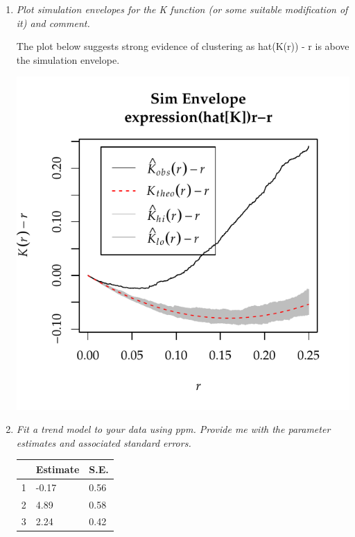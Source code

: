 \documentclass{article}\usepackage[]{graphicx}\usepackage[]{color}
\makeatletter
\def\maxwidth{ %
  \ifdim\Gin@nat@width>\linewidth
    \linewidth
  \else
    \Gin@nat@width
  \fi
}
\newenvironment{knitrout}{}{} %
\makeatother
\begin{document}
\begin{enumerate}
\begin{enumerate}
\begin{knitrout}
{}



\end{knitrout}


\newpage

\item %
{\it Plot simulation envelopes for the K function (or some suitable modification of it) and comment.}

The plot below suggests strong evidence of clustering as hat(K(r)) - r is above the simulation envelope.

\begin{knitrout}\footnotesize
{}\color{fgcolor}

{\centering \includegraphics[width=\maxwidth]{figure/prob2b-1} 

}



\end{knitrout}

\item %
{\it Fit a trend model to your data using ppm. Provide me with the parameter estimates and associated standard errors.}

\begin{table}[ht]
\centering
\begin{tabular}{||l|l|l||}
  \hline
 & Estimate & S.E. \\ 
  \hline
1 & -0.17 & 0.56 \\ 
  2 & 4.89 & 0.58 \\ 
  3 & 2.24 & 0.42 \\ 
   \hline
\end{tabular}
\end{table}



\end{enumerate}
\end{enumerate}
\end{document}
